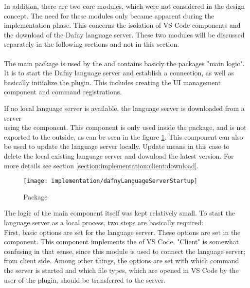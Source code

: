 In addition, there are two core modules, which were not considered in the design concept.
The need for these modules only became apparent during the implementation phase.
This concerns the isolation of VS Code components
and the download of the Dafny language server.
These two modules will be discussed separately in the following sections and not in this section. \\

\textbf{}\\
The main package  is used by the 
and contains basicly the packages "main logic".
It is to start the Dafny language server and establish a connection,
as well as basically initialize the plugin. This includes creating the UI management component and command registrations.

If no local language server is available, the language server is downloaded from a server \\
using the  component.
This component is only used inside the package, and is not exported to the outside,
as can be seen in the figure \ref{fig:placeholder_ref}.
This component can also be used to update the language server locally.
Update means in this case to delete the local existing language server and download the latest version.
For more details see section \ref{section:implementation:client:download}.

\begin{figure}[H]
    \centering
    \texttt{[image: implementation/dafnyLanguageServerStartup]}
    \caption{Package }
    \label{fig:placeholder_ref}
\end{figure}

The logic of the main component  itself was kept relatively small.
To start the language server as a local process, two steps are basically required:\\

First, basic options are set for the language server.
These options are set in the  component. This component implements the 
of VS Code. "Client" is somewhat confusing in that sense, since this module is used to connect the language server; from client side.
Among other things, the options are set with which command the server is started and which file types, which are opened in VS Code by the user of the plugin, should be transferred to the server. \\

